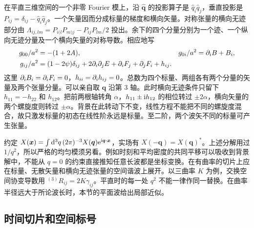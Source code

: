 在平直三维空间的一个非零 Fourier 模上，沿 $\hat{\bm q}$ 的投影算子是 $\hat q_i\hat q_j$，垂直投影是 $P_{ij}=\delta_{ij}-\hat q_i\hat q_j$。一个矢量因而分成标量的梯度和横向矢量。对称张量的横向无迹部分由 $\Lambda_{ij,lm}=P_{i(l}P_{m)j}-P_{ij}P_{lm}/2$ 投出。余下的四个分量分别为一个迹、一个纵向无迹分量及一个横向矢量的对称导数。相应地写
\begin{equation}\label{eq:cl-svt}
\begin{aligned}
 g_{00}/a^2&=-(1+2A),&
 g_{0i}/a^2&=\partial_iB+B_i,\\
 g_{ij}/a^2&=(1-2\psi)\delta_{ij}+2\partial_i\partial_j E
                  +\partial_i F_j+\partial_j F_i+h_{ij}.
\end{aligned}
\end{equation}
这里 $\partial_iB_i=\partial_iF_i=0$，$h_{ii}=\partial_i h_{ij}=0$。总数为四个标量、两组各有两个分量的矢量及两个张量分量。可以亲自取 $\bm q$ 沿第 3 轴。此时横向无迹条件只留下 $h_{11}=-h_{22}$ 和 $h_{12}$。把前两根轴转角 $\alpha$，$h_{11}\pm\mathrm{i} h_{12}$ 的相位转过 $\pm2\alpha$，横向矢量的两个螺旋度则转过 $\pm\alpha$。背景在此转动下不变，线性方程不能把不同的螺旋度混合，故只激发标量的初态在线性阶永远是标量。至二阶，两个波矢不同的标量可产生张量。

约定 $X(\bm x)=\int\dd^3q\,(2\pi)^{-3}X(\bm q)\mathrm{e}^{\mathrm{i}\bm q\cdot\bm x}$，实场有 $X(-\bm q)=X(\bm q)^*$。上述分解用过 $1/q^2$，所以严格的均匀模须另看。例如时刻和平均密度的共同平移可以吸收到背景解中，不能从 $q=0$ 的约束直接推知任意长波都是坐标变换。在有曲率的切片上应在标量、无散矢量和横向无迹张量的空间谐波上展开。以三曲率 $K$ 为例，交换空间协变导数用 ${}^{(3)}R_{ij}=2K\gamma_{ij}$。平直时的每一处 $q^2$ 不能一律作同一替换。在曲率半径远大于所论波长时，本节的平面波给出局部近似。

\subsection{时间切片和空间标号}

